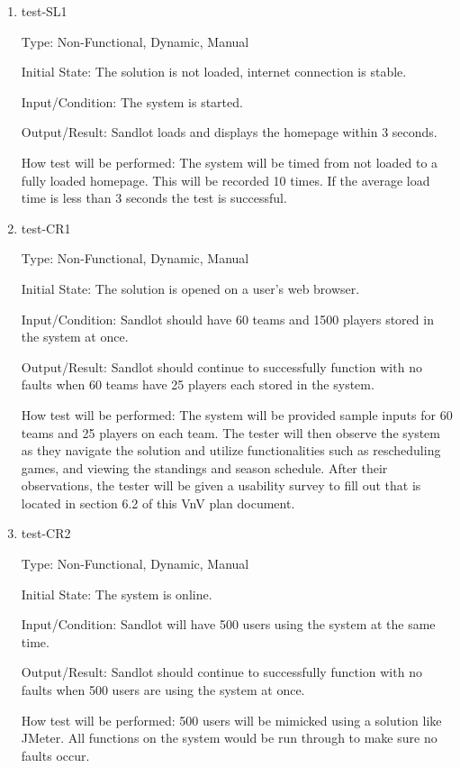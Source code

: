 \documentclass[12pt, titlepage]{article}
\begin{document}
\begin{enumerate}

  \item{test-SL1\\}

  Type: Non-Functional, Dynamic, Manual

  Initial State: The solution is not loaded, internet connection is stable.

  Input/Condition: The system is started.

  Output/Result: Sandlot loads and displays the homepage within 3 seconds.

  How test will be performed: The system will be timed from not loaded to a
  fully loaded homepage. This will be recorded 10 times. If the average load
  time is less than 3 seconds the test is successful.

  \item{test-CR1\\}

  Type: Non-Functional, Dynamic, Manual

  Initial State: The solution is opened on a user's web browser.

  Input/Condition: Sandlot should have 60 teams and 1500 players stored in the system at
  once.

  Output/Result: Sandlot should continue to successfully function with no faults when
  60 teams have 25 players each stored in the system.

  How test will be performed: The system will be provided sample inputs for 60 teams and
  25 players on each team. The tester will then observe the system as they navigate the
  solution and utilize functionalities such as rescheduling games, and viewing the standings
  and season schedule. After their observations, the tester will be given
  a usability survey to fill out that is located in section 6.2 of this VnV plan document.

  \item{test-CR2\\}

  Type: Non-Functional, Dynamic, Manual

  Initial State: The system is online.

  Input/Condition: Sandlot will have 500 users using the system at the same
  time.

  Output/Result: Sandlot should continue to successfully function with no
  faults when 500 users are using the system at once.

  How test will be performed: 500 users will be mimicked using a solution like
  JMeter. All functions on the system would be run through to make sure no
  faults occur.

\end{enumerate}
\end{document}
